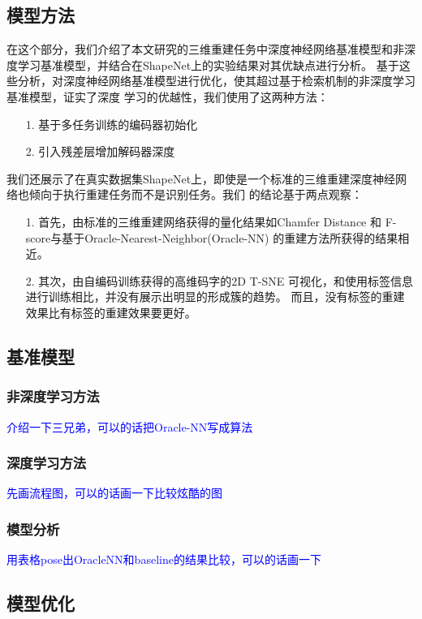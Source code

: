 \documentclass[bachelor, nocolorlinks, printoneside]{seuthesis} %
\newcommand\TODO[1]{\textcolor{blue}{#1}}
\begin{document}
\begin{Main}
\chapter{模型方法}
在这个部分，我们介绍了本文研究的三维重建任务中深度神经网络基准模型和非深度学习基准模型，并结合在ShapeNet上的实验结果对其优缺点进行分析。
基于这些分析，对深度神经网络基准模型进行优化，使其超过基于检索机制的非深度学习基准模型，证实了深度
学习的优越性，我们使用了这两种方法：
\begin{itemize}[\hspace{1cm}]
    \item[1.] 基于多任务训练的编码器初始化
    \item[2.] 引入残差层增加解码器深度
\end{itemize}
我们还展示了在真实数据集ShapeNet上，即使是一个标准的三维重建深度神经网络也倾向于执行重建任务而不是识别任务。我们
的结论基于两点观察：
\begin{itemize}[\hspace{1cm}]
    \item[1.] 首先，由标准的三维重建网络获得的量化结果如Chamfer Distance 和 F-score与基于Oracle-Nearest-Neighbor(Oracle-NN)
    的重建方法所获得的结果相近。
    \item[2.] 其次，由自编码训练获得的高维码字的2D T-SNE 可视化，和使用标签信息进行训练相比，并没有展示出明显的形成簇的趋势。
    而且，没有标签的重建效果比有标签的重建效果要更好。
\end{itemize}

\section{基准模型}
\subsection{非深度学习方法}
\TODO{介绍一下三兄弟，可以的话把Oracle-NN写成算法}
\subsection{深度学习方法}
\TODO{先画流程图，可以的话画一下比较炫酷的图}
\subsection{模型分析}
\TODO{用表格pose出OracleNN和baseline的结果比较，可以的话画一下}

\section{模型优化}

\end{Main}
\end{document}
